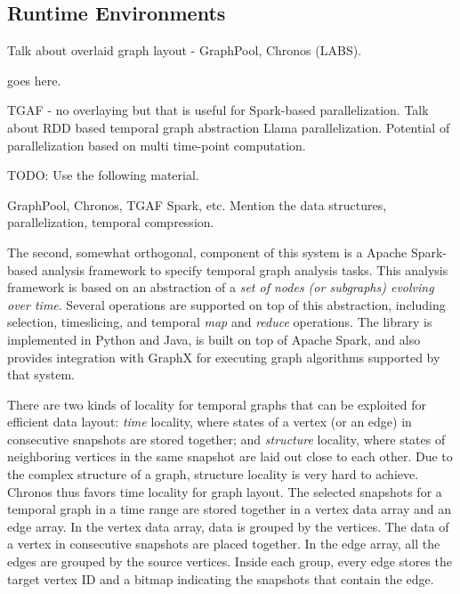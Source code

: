 \documentclass{svjour3}
\begin{document}
\subsection{Runtime Environments}

 Talk about overlaid graph layout - GraphPool, Chronos (LABS).  

 goes here.

 TGAF - no overlaying but that is useful for Spark-based parallelization. Talk about RDD based temporal graph abstraction
Llama parallelization. Potential of parallelization based on multi time-point computation.


TODO: Use the following material.

GraphPool, Chronos, TGAF Spark, etc. Mention the data structures, parallelization, temporal compression.

\vspace{2mm}
 The second, somewhat orthogonal, component of this system is a Apache Spark-based analysis
framework to specify temporal graph analysis tasks. This analysis framework is based on an abstraction of a \textit{set of nodes 
(or subgraphs) evolving over time}. Several operations are supported on top of this abstraction, including selection, timeslicing, and
temporal {\em map} and {\em reduce} operations. The library is implemented in Python and Java, is built on top of Apache Spark, and also provides
integration with GraphX for executing graph algorithms supported by that system.



 There are two kinds of locality for temporal graphs that can be exploited for efficient data layout: \emph{time} locality, where states of a vertex (or an edge) in consecutive snapshots are stored together; and \emph{structure} locality, where states of neighboring vertices in the same snapshot are laid out close to each other. Due to the complex structure of a graph, structure locality is very hard to achieve. Chronos thus favors time locality for graph layout. The selected snapshots for a temporal graph in a time range are stored together in a vertex data array and an edge array. In the vertex data array, data is grouped by the vertices. The data of a vertex in consecutive snapshots are placed together. In the edge array, all the edges are grouped by the source vertices. Inside each group, every edge stores the target vertex ID and a bitmap indicating the snapshots that contain the edge. 
\end{document}
